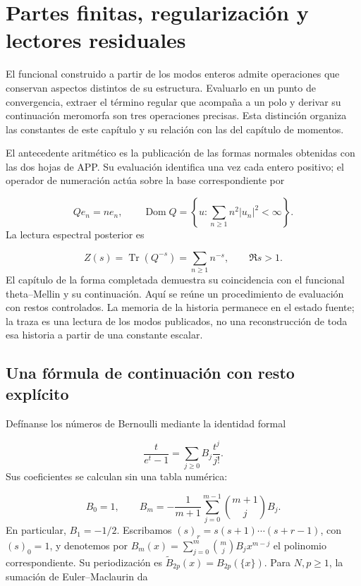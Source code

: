 \section{Partes finitas, regularización y lectores residuales}
\label{viii:lectura:manuscrito-04}
El funcional construido a partir de los modos enteros admite operaciones que conservan aspectos distintos de su estructura. Evaluarlo en un punto de convergencia, extraer el término regular que acompaña a un polo y derivar su continuación meromorfa son tres operaciones precisas. Esta distinción organiza las constantes de este capítulo y su relación con las del capítulo de momentos.

El antecedente aritmético es la publicación de las formas normales obtenidas con las dos hojas de APP. Su evaluación identifica una vez cada entero positivo; el operador de numeración actúa sobre la base correspondiente por

\[
Qe_n=ne_n,\qquad
\operatorname{Dom}Q=\left\{u:\sum_{n\geq1}n^2|u_n|^2<\infty\right\}.
\]
La lectura espectral posterior es

\[
Z(s)=\operatorname{Tr}(Q^{-s})=\sum_{n\geq1}n^{-s},\qquad \Re s>1.
\]
El capítulo de la forma completada demuestra su coincidencia con el funcional theta–Mellin y su continuación. Aquí se reúne un procedimiento de evaluación con restos controlados. La memoria de la historia permanece en el estado fuente; la traza es una lectura de los modos publicados, no una reconstrucción de toda esa historia a partir de una constante escalar.

\subsection{Una fórmula de continuación con resto explícito}
Defínanse los números de Bernoulli mediante la identidad formal

\[
\frac{t}{e^t-1}=\sum_{j\geq0}B_j\frac{t^j}{j!}.
\]
Sus coeficientes se calculan sin una tabla numérica:

\[
B_0=1,\qquad
B_m=-\frac1{m+1}\sum_{j=0}^{m-1}\binom{m+1}{j}B_j.
\]
En particular, \(B_1=-1/2\). Escribamos \((s)_r=s(s+1)\cdots(s+r-1)\), con \((s)_0=1\), y denotemos por \(B_m(x)=\sum_{j=0}^m\binom mjB_jx^{m-j}\) el polinomio correspondiente. Su periodización es \(\widetilde B_{2p}(x)=B_{2p}(\{x\})\). Para \(N,p\geq1\), la sumación de Euler–Maclaurin da

